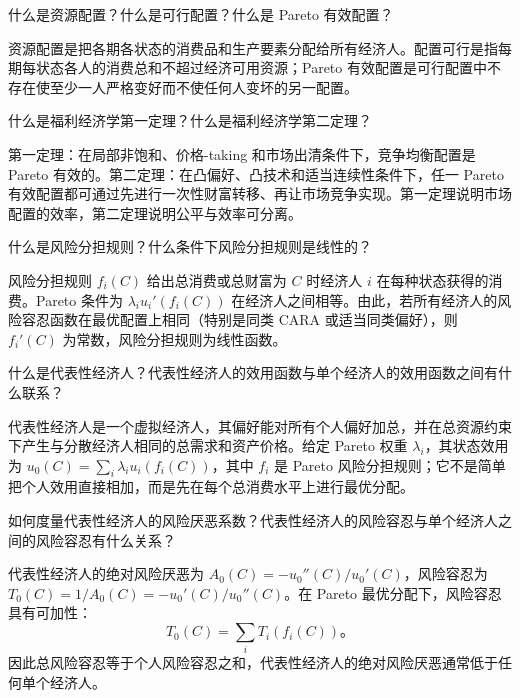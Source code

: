 
\begin{problem}
 什么是资源配置？什么是可行配置？什么是 Pareto 有效配置？
\end{problem}
\begin{solution}
资源配置是把各期各状态的消费品和生产要素分配给所有经济人。配置可行是指每期每状态各人的消费总和不超过经济可用资源；Pareto 有效配置是可行配置中不存在使至少一人严格变好而不使任何人变坏的另一配置。
\end{solution}
\begin{problem}
 什么是福利经济学第一定理？什么是福利经济学第二定理？
\end{problem}
\begin{solution}
第一定理：在局部非饱和、价格-taking 和市场出清条件下，竞争均衡配置是 Pareto 有效的。第二定理：在凸偏好、凸技术和适当连续性条件下，任一 Pareto 有效配置都可通过先进行一次性财富转移、再让市场竞争实现。第一定理说明市场配置的效率，第二定理说明公平与效率可分离。
\end{solution}
\begin{problem}
 什么是风险分担规则？什么条件下风险分担规则是线性的？
\end{problem}
\begin{solution}
风险分担规则 $f_i(C)$ 给出总消费或总财富为 $C$ 时经济人 $i$ 在每种状态获得的消费。Pareto 条件为 $\lambda_i u_i'(f_i(C))$ 在经济人之间相等。由此，若所有经济人的风险容忍函数在最优配置上相同（特别是同类 CARA 或适当同类偏好），则 $f_i'(C)$ 为常数，风险分担规则为线性函数。
\end{solution}
\begin{problem}
 什么是代表性经济人？代表性经济人的效用函数与单个经济人的效用函数之间有什么联系？
\end{problem}
\begin{solution}
代表性经济人是一个虚拟经济人，其偏好能对所有个人偏好加总，并在总资源约束下产生与分散经济人相同的总需求和资产价格。给定 Pareto 权重 $\lambda_i$，其状态效用为 $u_0(C)=\sum_i\lambda_i u_i(f_i(C))$，其中 $f_i$ 是 Pareto 风险分担规则；它不是简单把个人效用直接相加，而是先在每个总消费水平上进行最优分配。
\end{solution}
\begin{problem}
 如何度量代表性经济人的风险厌恶系数？代表性经济人的风险容忍与单个经济人之间的风险容忍有什么关系？
\end{problem}
\begin{solution}
代表性经济人的绝对风险厌恶为 $A_0(C)=-u_0''(C)/u_0'(C)$，风险容忍为 $T_0(C)=1/A_0(C)=-u_0'(C)/u_0''(C)$。在 Pareto 最优分配下，风险容忍具有可加性：
\[
T_0(C)=\sum_iT_i(f_i(C))。
\]
因此总风险容忍等于个人风险容忍之和，代表性经济人的绝对风险厌恶通常低于任何单个经济人。
\end{solution}
